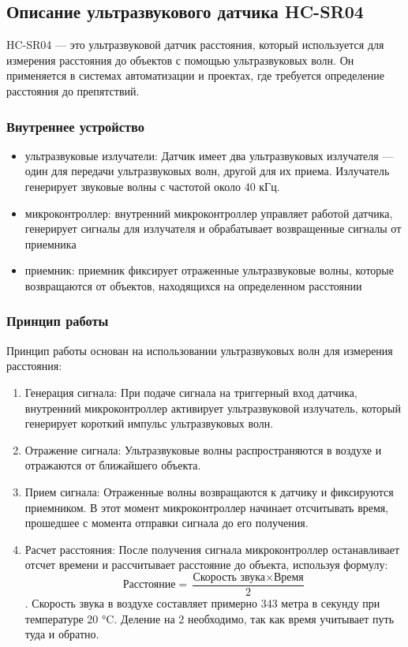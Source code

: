 \documentclass{bmstu}
\begin{document}
    \subsection{Описание ультразвукового датчика HC-SR04}
    HC-SR04\cite{UltrazvukovoyDalnomerHCSR04} — это ультразвуковой датчик расстояния, который используется для измерения расстояния до объектов с помощью ультразвуковых волн. Он применяется в  системах автоматизации и проектах, где требуется определение расстояния до препятствий.

    \subsubsection{Внутреннее устройство}
    \begin{itemize}
        \item ультразвуковые излучатели: Датчик имеет два ультразвуковых излучателя — один для передачи ультразвуковых волн, другой для их приема. Излучатель генерирует звуковые волны с частотой около 40 кГц.
        \item микроконтроллер: внутренний микроконтроллер управляет работой датчика, генерирует сигналы для излучателя и обрабатывает возвращенные сигналы от приемника
        \item приемник: приемник фиксирует отраженные ультразвуковые волны, которые возвращаются от объектов, находящихся на определенном расстоянии
    \end{itemize}

    \subsubsection{Принцип работы}
    Принцип работы основан на использовании ультразвуковых волн для измерения расстояния:
    \begin{enumerate}
        \item Генерация сигнала: При подаче сигнала на триггерный вход датчика, внутренний микроконтроллер активирует ультразвуковой излучатель, который генерирует короткий импульс ультразвуковых волн.
        \item Отражение сигнала: Ультразвуковые волны распространяются в воздухе и отражаются от ближайшего объекта.
        \item Прием сигнала: Отраженные волны возвращаются к датчику и фиксируются приемником. В этот момент микроконтроллер начинает отсчитывать время, прошедшее с момента отправки сигнала до его получения.
        \item Расчет расстояния: После получения сигнала микроконтроллер останавливает отсчет времени и рассчитывает расстояние до объекта, используя формулу: $$\text{Расстояние} = \frac{\text{Скорость звука} \times \text{Время}}{2}$$. Скорость звука в воздухе составляет примерно 343 метра в секунду при температуре 20 °C. Деление на 2 необходимо, так как время учитывает путь туда и обратно.
    \end{enumerate}
\end{document}
